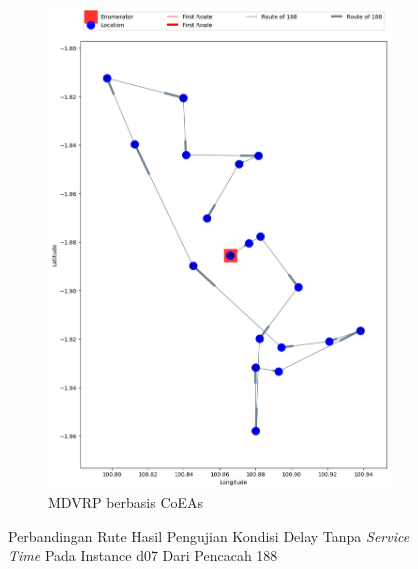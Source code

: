 \begin{figure}[H]
	\centering
	\begin{subfigure}[t]{\textwidth}
		\centering
		\includegraphics[width=\textwidth]{Resources/Images/delayed_7/real_m15_n100_delayed_7_188_coes}
		\caption{MDVRP berbasis CoEAs}
		\label{fig:real_m15_n100_delayed_7_188_coes}
	\end{subfigure}
	\caption{Perbandingan Rute Hasil Pengujian Kondisi Delay Tanpa \textit{Service Time} Pada Instance d07 Dari Pencacah 188}
	\label{fig:real_m15_n100_delayed_7_188}
\end{figure}


